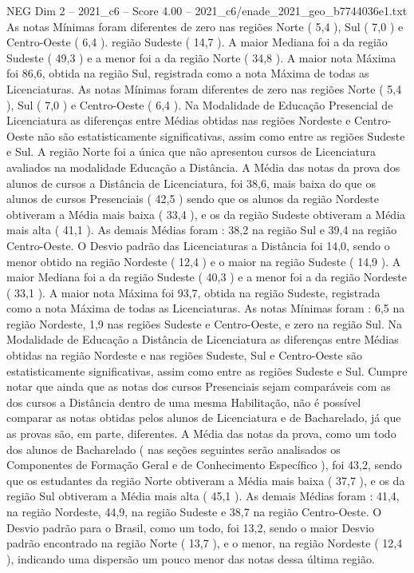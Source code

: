 \begin{textsample}{NEG Dim 2 – 2021\_c6 – Score 4.00 – 2021\_c6/enade\_2021\_geo\_b7744036e1.txt}
As notas Mínimas foram diferentes de zero nas regiões Norte ( 5,4 ), Sul ( 7,0 ) e Centro-Oeste ( 6,4 ). região Sudeste ( 14,7 ).
A maior Mediana foi a da região Sudeste ( 49,3 ) e a menor foi a da região Norte ( 34,8 ).
A maior nota Máxima foi 86,6, obtida na região Sul, registrada como a nota Máxima de todas as Licenciaturas.
As notas Mínimas foram diferentes de zero nas regiões Norte ( 5,4 ), Sul ( 7,0 ) e Centro-Oeste ( 6,4 ).
Na Modalidade de Educação Presencial de Licenciatura as diferenças entre Médias obtidas nas regiões Nordeste e Centro-Oeste não são estatisticamente significativas, assim como entre as regiões Sudeste e Sul.
A região Norte foi a única que não apresentou cursos de Licenciatura avaliados na modalidade Educação a Distância.
A Média das notas da prova dos alunos de cursos a Distância de Licenciatura, foi 38,6, mais baixa do que os alunos de cursos Presenciais ( 42,5 ) sendo que os alunos da região Nordeste obtiveram a Média mais baixa ( 33,4 ), e os da região Sudeste obtiveram a Média mais alta ( 41,1 ).
As demais Médias foram : 38,2 na região Sul e 39,4 na região Centro-Oeste.
O Desvio padrão das Licenciaturas a Distância foi 14,0, sendo o menor obtido na região Nordeste ( 12,4 ) e o maior na região Sudeste ( 14,9 ).
A maior Mediana foi a da região Sudeste ( 40,3 ) e a menor foi a da região Nordeste ( 33,1 ).
A maior nota Máxima foi 93,7, obtida na região Sudeste, registrada como a nota Máxima de todas as Licenciaturas.
As notas Mínimas foram : 6,5 na região Nordeste, 1,9 nas regiões Sudeste e Centro-Oeste, e zero na região Sul.
Na Modalidade de Educação a Distância de Licenciatura as diferenças entre Médias obtidas na região Nordeste e nas regiões Sudeste, Sul e Centro-Oeste são estatisticamente significativas, assim como entre as regiões Sudeste e Sul.
Cumpre notar que ainda que as notas dos cursos Presenciais sejam comparáveis com as dos cursos a Distância dentro de uma mesma Habilitação, não é possível comparar as notas obtidas pelos alunos de Licenciatura e de Bacharelado, já que as provas são, em parte, diferentes.
A Média das notas da prova, como um todo dos alunos de Bacharelado ( nas seções seguintes serão analisados os Componentes de Formação Geral e de Conhecimento Específico ), foi 43,2, sendo que os estudantes da região Norte obtiveram a Média mais baixa ( 37,7 ), e os da região Sul obtiveram a Média mais alta ( 45,1 ).
As demais Médias foram : 41,4, na região Nordeste, 44,9, na região Sudeste e 38,7 na região Centro-Oeste.
O Desvio padrão para o Brasil, como um todo, foi 13,2, sendo o maior Desvio padrão encontrado na região Norte ( 13,7 ), e o menor, na região Nordeste ( 12,4 ), indicando uma dispersão um pouco menor das notas dessa última região.

\end{textsample}
